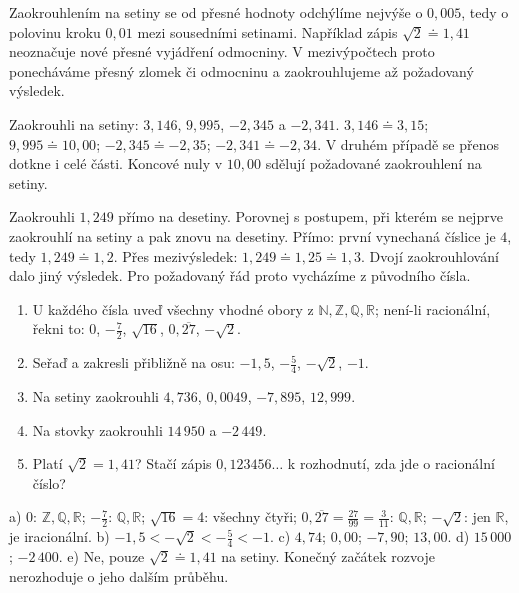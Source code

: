\documentclass[11pt,a4paper]{article}
\begin{document}
Zaokrouhlením na setiny se od přesné hodnoty odchýlíme nejvýše
o $0{,}005$, tedy o polovinu kroku $0{,}01$ mezi sousedními setinami.
Například zápis $\sqrt2\doteq1{,}41$ neoznačuje nové přesné vyjádření
odmocniny. V mezivýpočtech proto ponecháváme přesný zlomek či odmocninu
a zaokrouhlujeme až požadovaný výsledek.

\begin{prikladReseniBox}[title={Příklad 4},breakable=false]
Zaokrouhli na setiny: $3{,}146$, $9{,}995$, $-2{,}345$ a $-2{,}341$.
\tcblower
$3{,}146\doteq3{,}15$; $9{,}995\doteq10{,}00$;
$-2{,}345\doteq-2{,}35$; $-2{,}341\doteq-2{,}34$.
V druhém případě se přenos dotkne i celé části. Koncové nuly
v $10{,}00$ sdělují požadované zaokrouhlení na setiny.
\end{prikladReseniBox}

\begin{prikladReseniBox}[title={Příklad 5},breakable=false]
Zaokrouhli $1{,}249$ přímo na desetiny. Porovnej s postupem,
při kterém se nejprve zaokrouhlí na setiny a pak znovu na desetiny.
\tcblower
Přímo: první vynechaná číslice je $4$, tedy $1{,}249\doteq1{,}2$.
Přes mezivýsledek: $1{,}249\doteq1{,}25\doteq1{,}3$.
Dvojí zaokrouhlování dalo jiný výsledek. Pro požadovaný řád proto
vycházíme z původního čísla.
\end{prikladReseniBox}

\begin{zadaniReseniBox}[title={Samostatná práce 1},breakable=false]
\begin{enumerate}[label=\alph*)]
\item U každého čísla uveď všechny vhodné obory z $\mathbb N,\mathbb Z,
\mathbb Q,\mathbb R$; není-li racionální, řekni to:
$0$, $-\frac72$, $\sqrt{16}$, $0{,}\overline{27}$, $-\sqrt2$.
\item Seřaď a zakresli přibližně na osu: $-1{,}5$, $-\frac54$, $-\sqrt2$, $-1$.
\item Na setiny zaokrouhli $4{,}736$, $0{,}0049$, $-7{,}895$, $12{,}999$.
\item Na stovky zaokrouhli $14\,950$ a $-2\,449$.
\item Platí $\sqrt2=1{,}41$? Stačí zápis $0{,}123456\ldots$ k rozhodnutí,
zda jde o racionální číslo?
\end{enumerate}
\tcblower
a) $0$: $\mathbb Z,\mathbb Q,\mathbb R$;
$-\frac72$: $\mathbb Q,\mathbb R$;
$\sqrt{16}=4$: všechny čtyři;
$0{,}\overline{27}=\frac{27}{99}=\frac3{11}$: $\mathbb Q,\mathbb R$;
$-\sqrt2$: jen $\mathbb R$, je iracionální.
b) $-1{,}5<-\sqrt2<-\frac54<-1$.
c) $4{,}74$; $0{,}00$; $-7{,}90$; $13{,}00$.
d) $15\,000$; $-2\,400$.
e) Ne, pouze $\sqrt2\doteq1{,}41$ na setiny.
Konečný začátek rozvoje nerozhoduje o jeho dalším průběhu.
\end{zadaniReseniBox}
\end{document}
